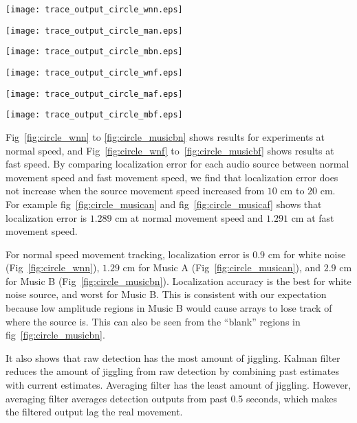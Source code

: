 \begin{figure*}[]
\centering
\texttt{[image: trace\_output\_circle\_wnn.eps]}
\caption{white noise ($10$ cm per second)}
\label{fig:circle_wnn}
\end{figure*}

\begin{figure*}[]
\centering
\texttt{[image: trace\_output\_circle\_man.eps]}
\caption{music A ($10$ cm per second)}
\label{fig:circle_musican}
\end{figure*}

\begin{figure*}[]
\centering
\texttt{[image: trace\_output\_circle\_mbn.eps]}
\caption{music B ($10$ cm per second)}
\label{fig:circle_musicbn}
\end{figure*}

\begin{figure*}[]
\centering
\texttt{[image: trace\_output\_circle\_wnf.eps]}
\caption{white noise ($20$ cm per second)}
\label{fig:circle_wnf}
\end{figure*}

\begin{figure*}[]
\centering
  \texttt{[image: trace\_output\_circle\_maf.eps]}
  \caption{music A ($20$ cm per second)}
  \label{fig:circle_musicaf}
\end{figure*}

\begin{figure*}[]
\centering
  \texttt{[image: trace\_output\_circle\_mbf.eps]}
  \caption{music B ($20$ cm per second)}
  \label{fig:circle_musicbf}
\end{figure*}

Fig~\ref{fig:circle_wnn} to \ref{fig:circle_musicbn} shows results for experiments at normal speed, and Fig~\ref{fig:circle_wnf} to~\ref{fig:circle_musicbf} shows results at fast speed. By comparing localization error for each audio source between normal movement speed and fast movement speed, we find that localization error does not increase when the source movement speed increased from $10$ cm to $20$ cm. For example fig~\ref{fig:circle_musican} and fig~\ref{fig:circle_musicaf} shows that localization error is $1.289$ cm at normal movement speed and $1.291$ cm at fast movement speed.

For normal speed movement tracking, localization error is $0.9$ cm for white noise (Fig~\ref{fig:circle_wnn}), $1.29$ cm for Music A (Fig~\ref{fig:circle_musican}), and $2.9$ cm for Music B (Fig~\ref{fig:circle_musicbn}). Localization accuracy is the best for white noise source, and worst for Music B. This is consistent with our expectation because low amplitude regions in Music B would cause arrays to lose track of where the source is. This can also be seen from the ``blank'' regions in fig~\ref{fig:circle_musicbn}. 

It also shows that raw detection has the most amount of jiggling. Kalman filter reduces the amount of jiggling from raw detection by combining past estimates with current estimates. Averaging filter has the least amount of jiggling. However, averaging filter averages detection outputs from past 0.5 seconds, which makes the filtered output lag the real movement.
